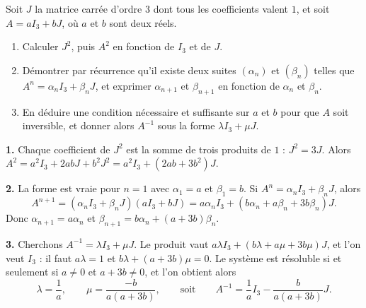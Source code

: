 \begin{concours}
Soit $J$ la matrice carrée d'ordre $3$ dont tous les coefficients valent $1$,
et soit $A = aI_{3}+bJ$, où $a$ et $b$ sont deux réels.

\begin{enumerate}[label=\textbf{\arabic*.}, leftmargin=*, itemsep=0.25em]
  \item Calculer $J^{2}$, puis $A^{2}$ en fonction de $I_{3}$ et de $J$.
  \item Démontrer par récurrence qu'il existe deux suites $(\alpha_{n})$ et
        $(\beta_{n})$ telles que $A^{n} = \alpha_{n}I_{3}+\beta_{n}J$, et
        exprimer $\alpha_{n+1}$ et $\beta_{n+1}$ en fonction de
        $\alpha_{n}$ et $\beta_{n}$.
  \item En déduire une condition nécessaire et suffisante sur $a$ et $b$ pour
        que $A$ soit inversible, et donner alors $A^{-1}$ sous la forme
        $\lambda I_{3}+\mu J$.
\end{enumerate}
\end{concours}

\begin{corrige}
\textbf{1.} Chaque coefficient de $J^{2}$ est la somme de trois produits de
$1$ : $J^{2} = 3J$. Alors
$A^{2} = a^{2}I_{3}+2abJ+b^{2}J^{2} = a^{2}I_{3}+\left(2ab+3b^{2}\right)J$.

\textbf{2.} La forme est vraie pour $n = 1$ avec $\alpha_{1} = a$ et
$\beta_{1} = b$. Si $A^{n} = \alpha_{n}I_{3}+\beta_{n}J$, alors
\[
  A^{n+1} = \left(\alpha_{n}I_{3}+\beta_{n}J\right)\left(aI_{3}+bJ\right)
  = a\alpha_{n}I_{3}
  +\left(b\alpha_{n}+a\beta_{n}+3b\beta_{n}\right)J .
\]
Donc $\alpha_{n+1} = a\alpha_{n}$ et
$\beta_{n+1} = b\alpha_{n}+(a+3b)\beta_{n}$.

\textbf{3.} Cherchons $A^{-1} = \lambda I_{3}+\mu J$. Le produit vaut
$a\lambda I_{3}+\left(b\lambda+a\mu+3b\mu\right)J$, et l'on veut
$I_{3}$ : il faut $a\lambda = 1$ et $b\lambda+(a+3b)\mu = 0$. Le système est
résoluble si et seulement si $a \neq 0$ et $a+3b \neq 0$, et l'on obtient
alors
\[
  \lambda = \frac1a, \qquad \mu = \frac{-b}{a(a+3b)},
  \qquad\text{soit}\qquad
  A^{-1} = \frac1a I_{3}-\frac{b}{a(a+3b)}J .
\]
\end{corrige}

